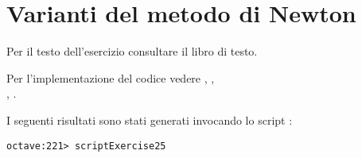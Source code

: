 \section{Varianti del metodo di Newton}
\label{sec:variantsMetodoDiNewton}

\begin{exercise}[2.5]
Per il testo dell'esercizio consultare il libro di testo.
\end{exercise}

Per l'implementazione del codice vedere ,
,
\\,
.

I seguenti risultati sono stati generati invocando lo script
:
\begin{lstlisting}
octave:221> scriptExercise25
\end{lstlisting}

